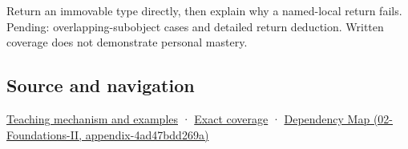 Return an immovable type directly, then explain why a named-local return fails. Pending: overlapping-subobject cases and detailed return deduction. Written coverage does not demonstrate personal mastery.

\subsection{Source and navigation}\label{appendix-b08d3788c5c6-source-and-navigation}

\hyperref[01-foundations-i-ch003-return-a-result-without-handing-out-a-lifetime-problem]{Teaching mechanism and examples} · \hyperref[appendix-fd090d982a15-m009---parts-127-147]{Exact coverage} · \href{../02-Foundations-II/main.pdf\#nameddest=appendix-4ad47bdd269a}{Dependency Map (02-Foundations-II, appendix-4ad47bdd269a)}
